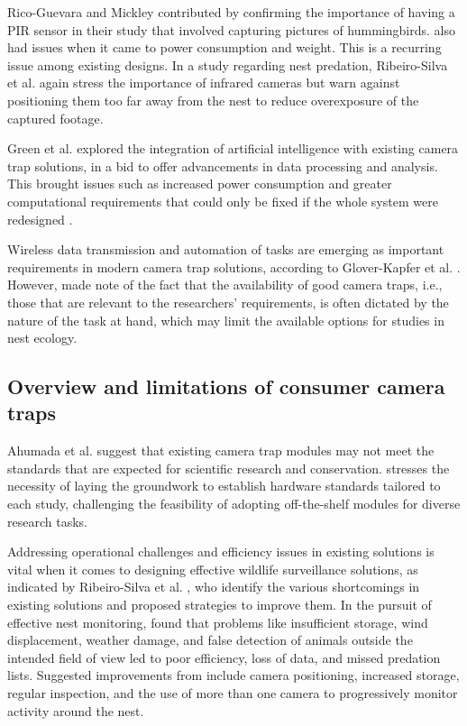 \documentclass[class=report,11pt,crop=false]{standalone}
\begin{document}
Rico-Guevara and Mickley \cite{rico-guevara2017bring} contributed by confirming the importance of having a PIR sensor in their study that involved capturing pictures of hummingbirds. \cite{rico-guevara2017bring} also had issues when it came to power consumption and weight. This is a recurring issue among existing designs. In a study regarding nest predation, Ribeiro-Silva et al. \cite{ribeiro-silva2018testing} again stress the importance of infrared cameras but warn against positioning them too far away from the nest to reduce overexposure of the captured footage.

Green et al. \cite{green2020innovations} explored the integration of artificial intelligence with existing camera trap solutions, in a bid to offer advancements in data processing and analysis. This brought issues such as increased power consumption and greater computational requirements that could only be fixed if the whole system were redesigned \cite{green2020innovations}. 

Wireless data transmission and automation of tasks are emerging as important requirements in modern camera trap solutions, according to Glover-Kapfer et al. \cite{glover2019camera}. However, \cite{glover2019camera} made note of the fact that the availability of good camera traps, i.e., those that are relevant to the researchers’ requirements, is often dictated by the nature of the task at hand, which may limit the available options for studies in nest ecology.  

\subsection{Overview and limitations of consumer camera traps}

Ahumada et al. \cite{ahumada2020wildlife} suggest that existing camera trap modules may not meet the standards that are expected for scientific research and conservation. \cite{ahumada2020wildlife} stresses the necessity of laying the groundwork to establish hardware standards tailored to each study, challenging the feasibility of adopting off-the-shelf modules for diverse research tasks. 

Addressing operational challenges and efficiency issues in existing solutions is vital when it comes to designing effective wildlife surveillance solutions, as indicated by Ribeiro-Silva  et al. \cite{ribeiro-silva2018testing}, who identify the various shortcomings in existing solutions and proposed strategies to improve them. In the pursuit of effective nest monitoring, \cite{ribeiro-silva2018testing} found that problems like insufficient storage, wind displacement, weather damage, and false detection of animals outside the intended field of view led to poor efficiency, loss of data, and missed predation lists. Suggested improvements from \cite{ribeiro-silva2018testing} include camera positioning, increased storage, regular inspection, and the use of more than one camera to progressively monitor activity around the nest. 
\end{document}
